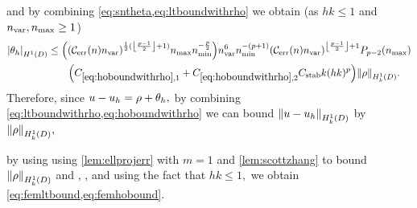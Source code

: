 and by combining \cref{eq:sntheta,eq:ltboundwithrho} we obtain (as $hk \leq 1$ and $n_{\mathrm{var}},n_{\max} \geq 1$)
\begin{align}
\SNHoD{\thetah} &\leq
\mleft(\mleft(\En\nvar\mright)^{\half(\floor{\frac{p-1}2}+1)}\nmax\nmin^{-\frac{p}2}\mright)\nvar^6\nmin^{-(p+1)} \mleft(\En \nvar\mright)^{\floor{\frac{p-1}2}+1}\Pfn{p-2}\mleft(\nmax\mright)\nonumber\\
&\quad\quad\mleft(\CHoboundo  +\CHoboundt \CAnk k(hk)^p\mright)\NHokD{\rho}.\label{eq:hoboundwithrho}
\end{align}
Therefore, since $u-u_{h} = \rho + \theta_{h},$ by combining \cref{eq:ltboundwithrho,eq:hoboundwithrho} we can bound $\NHokD{u-\uh}$ by $\NHokD{\rho},$

by using using \cref{lem:ellprojerr} with $m=1$ and \cref{lem:scottzhang} to bound $\NHokD{\rho}$ and  , , and using the fact that $hk \leq 1,$ we obtain \cref{eq:femltbound,eq:femhobound}.
\epf
{}
